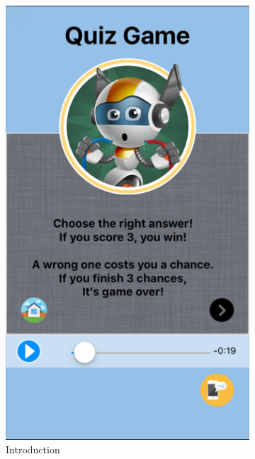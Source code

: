 \begin{figure}[!hbt]\centering
    \begin{subfigure}{0.27\textwidth}
\includegraphics[width=\textwidth]{game1}
\caption{Introduction}
    \end{subfigure}\hspace{0.03\textwidth}
 \begin{subfigure}{0.27\textwidth}

\end{subfigure}
\end{figure}
